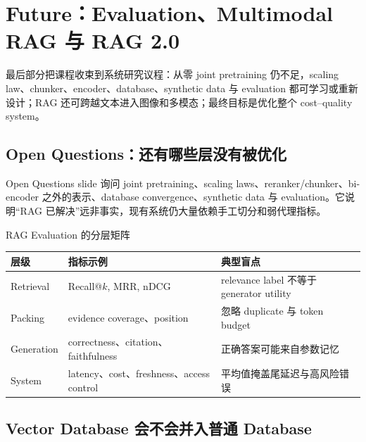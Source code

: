 \section{Future：Evaluation、Multimodal RAG 与 RAG 2.0}

最后部分把课程收束到系统研究议程：从零 joint pretraining 仍不足，scaling law、chunker、encoder、database、synthetic data 与 evaluation 都可学习或重新设计；RAG 还可跨越文本进入图像和多模态；最终目标是优化整个 cost--quality system。

\subsection{Open Questions：还有哪些层没有被优化}

Open Questions slide 询问 joint pretraining、scaling laws、reranker/chunker、bi-encoder 之外的表示、database convergence、synthetic data 与 evaluation。它说明“RAG 已解决”远非事实，现有系统仍大量依赖手工切分和弱代理指标。


\begin{knowledgebox}{RAG Evaluation 的分层矩阵}
\begin{tabularx}{\textwidth}{L{0.18\textwidth}>{\raggedright\arraybackslash}X >{\raggedright\arraybackslash}X}
\toprule
层级 & 指标示例 & 典型盲点 \\
\midrule
Retrieval & Recall@$k$, MRR, nDCG & relevance label 不等于 generator utility \\
Packing & evidence coverage、position & 忽略 duplicate 与 token budget \\
Generation & correctness、citation、faithfulness & 正确答案可能来自参数记忆 \\
System & latency、cost、freshness、access control & 平均值掩盖尾延迟与高风险错误 \\
\bottomrule
\end{tabularx}
\end{knowledgebox}


\subsection{Vector Database 会不会并入普通 Database}

